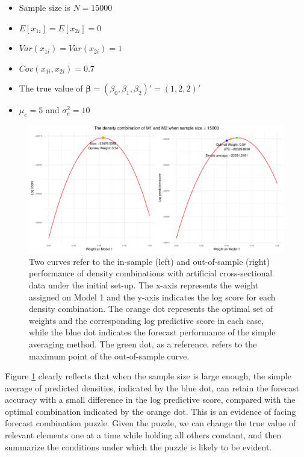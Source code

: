 \documentclass{monashthesis}
\begin{document}
\begin{itemize}
\item
  Sample size is \(N=15000\)
\item
  \(E[x_{1i}] = E[x_{2i}] = 0\)
\item
  \(Var(x_{1i}) = Var(x_{2i}) = 1\)
\item
  \(Cov(x_{1i}, x_{2i}) = 0.7\)
\item
  The true value of \(\pmb{\beta} = (\beta_0, \beta_1, \beta_2)' = (1,2,2)'\)
\item
  \(\mu_e = 5\) and \(\sigma^2_e=10\)
\end{itemize}

\begin{figure}[ht]
\centering
\includegraphics[scale=0.6]{figures/Sample_Size_15000.pdf}
\caption{Two curves refer to the in-sample (left) and out-of-sample (right) performance of density combinations with artificial cross-sectional data under the initial set-up. The x-axis represents the weight assigned on Model 1 and the y-axis indicates the log score for each density combination. The orange dot represents the optimal set of weights and the corresponding log predictive score in each case, while the blue dot indicates the forecast performance of the simple averaging method. The green dot, as a reference, refers to the maximum point of the out-of-sample curve.}
\label{fig:ss15000}
\end{figure}

Figure \ref{fig:ss15000} clearly reflects that when the sample size is large enough, the simple average of predicted densities, indicated by the blue dot, can retain the forecast accuracy with a small difference in the log predictive score, compared with the optimal combination indicated by the orange dot. This is an evidence of facing forecast combination puzzle. Given the puzzle, we can change the true value of relevant elements one at a time while holding all others constant, and then summarize the conditions under which the puzzle is likely to be evident.
\end{document}
